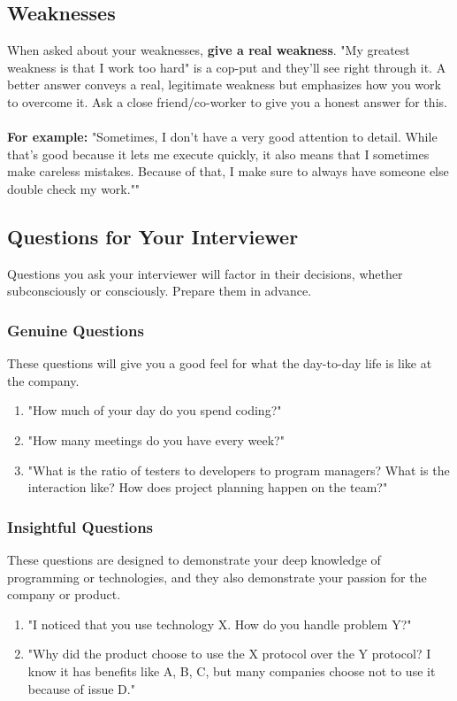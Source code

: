 \documentclass{article}
\begin{document}
	\subsection{Weaknesses}
		When asked about your weaknesses, {\bf give a real weakness}. "My greatest weakness is that I work too hard" is a cop-put and they'll see right through it. A better answer conveys a real, legitimate weakness but emphasizes how you work to overcome it. Ask a close friend/co-worker to give you a honest answer for this.
		\\ \\
		{\bf For example:} "Sometimes, I don't have a very good attention to detail. While that's good because it lets me execute quickly, it also means that I sometimes make careless mistakes. Because of that, I make sure to always have someone else double check my work.""

	\subsection{Questions for Your Interviewer}
		Questions you ask your interviewer will factor in their decisions, whether subconsciously or consciously. Prepare them in advance.

		\subsubsection{Genuine Questions}
			These questions will give you a good feel for what the day-to-day life is like at the company.
			\begin{enumerate}
				\item "How much of your day do you spend coding?"
				\item "How many meetings do you have every week?"
				\item "What is the ratio of testers to developers to program managers? What is the interaction like? How does project planning happen on the team?"
			\end{enumerate}

		\subsubsection{Insightful Questions}
			These questions are designed to demonstrate your deep knowledge of programming or technologies, and they also demonstrate your passion for the company or product.
			\begin{enumerate}
				\item "I noticed that you use technology X. How do you handle problem Y?"
				\item "Why did the product choose to use the X protocol over the Y protocol? I know it has benefits like A, B, C, but many companies choose not to use it because of issue D."
			\end{enumerate}
\end{document}
